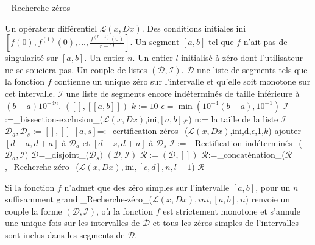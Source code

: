 \documentclass[a4paper,10pt]{article}
\begin{document}
	\begin{algorithm}
		\caption{\_Recherche-zéros\_}
		\begin{algorithmic}[1]
			\REQUIRE Un opérateur différentiel $\mathcal{L}(x,Dx)$. Des conditions initiales ini=$[f(0),f^{(1)}(0),...,\frac{f^{(r-1)}(0)}{r-1!}]$. Un segment $[a,b]$ tel que $f$ n'ait pas de singularité sur $[a,b]$. Un entier $n$. Un entier $l$ initialisé à zéro dont l'utilisateur ne se souciera pas. 
			\ENSURE Un couple de listes $(\mathcal{D},\mathcal{I})$. $\mathcal{D}$ une liste de segments tels que la fonction $f$ contienne un unique zéro sur l'intervalle et qu'elle soit monotone sur cet intervalle. $\mathcal{I}$ une liste de segments encore indéterminés de taille inférieure à $(b-a)10^{-4n}$.
			\RETURN $([],[[a,b]])$
			\ENDIF
			\STATE $k:=10$
			\STATE $\epsilon=\min(10^{-4}(b-a),10^{-1})$
			\STATE $\mathcal{I}$:=\_bissection-exclusion\_($\mathcal{L}(x,Dx)$,ini,$[a,b]$,$\epsilon$)
			\STATE n:= la taille de la liste $\mathcal{I}$ 
			\STATE $\mathcal{D}_a,\mathcal{D}_s:=[],[]$
			\STATE $[a,s]$=:\_certification-zéros\_($\mathcal{L}(x,Dx)$,ini,d,$\epsilon$,1,$k$)
			\STATE ajouter $[d-a,d+a]$ à $\mathcal{D}_a$ et $[d-s,d+a]$ à $\mathcal{D}_s$
			\ENDIF 
			\ENDFOR
			\STATE $\mathcal{I}:=$\_Rectification-indéterminés\_($\mathcal{D}_a,\mathcal{I})$
			\STATE $\mathcal{D}$=\_disjoint\_($\mathcal{D}_s)$
			\RETURN $(\mathcal{D},\mathcal{I})$
			\ELSE
			\STATE $\mathcal{R}:=(\mathcal{D},[])$
			\STATE $\mathcal{R}$:=\_concaténation\_($\mathcal{R}$,\_Recherche-zéro\_($\mathcal{L}(x,Dx),$ini$,[c,d],n,l+1$)
			\ENDFOR
			\ENDIF
			\RETURN $\mathcal{R}$
		\end{algorithmic}
	\end{algorithm}
	
	\begin{proposition}
		Si la fonction $f$ n'admet que des zéro simples sur l'intervalle $[a,b]$, pour un $n$ suffisamment grand  \_Recherche-zéro\_($\mathcal{L}(x,Dx),ini,[a,b],n$) renvoie un couple la forme $(\mathcal{D},\mathcal{I})$, où la fonction $f$ est strictement monotone et s'annule une unique fois sur les intervalles de $\mathcal{D}$ et tous les zéros simples de l'intervalles sont inclus dans les segments de $\mathcal{D}$. 
	\end{proposition}
	
\end{document}
